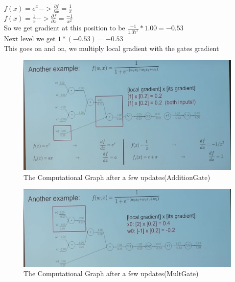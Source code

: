 \documentclass{article}
\begin{document}
\\
\\
\\
\\ \\ \\ \\
\\
\\
\\
\\
$f(x) = e^x -> \frac{\partial f}{\partial x} = \frac{1}{x}$
\\$f(x) = \frac{1}{x} -> \frac{\partial f}{\partial x} = \frac{-1}{x^2}$
\\ So we get gradient at this position to be $\frac{-1}{1.37^2} * 1.00 = -0.53$
\\ Next level we get $1*(-0.53) = -0.53$
\\ This goes on and on, we multiply local gradient with the gates gradient
\begin{figure}
  \includegraphics[width=\linewidth]{SS2.png}
  \caption{The Computational Graph after a few updates(AdditionGate)}
  \label{fig:cGraph1}
\end{figure}
\begin{figure}
  \includegraphics[width=\linewidth]{SS3.png}
  \caption{The Computational Graph after a few updates(MultGate)}
  \label{fig:cGraph1}
\end{figure}
\end{document}
